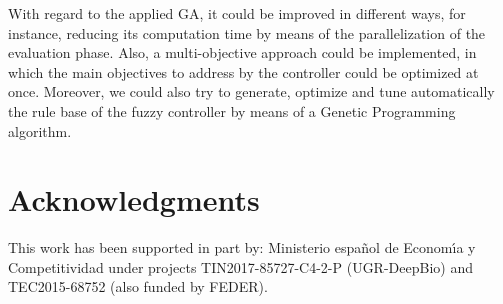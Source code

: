 \documentclass[conference]{IEEEtran}
\begin{document}
With regard to the applied GA, it could be improved in different ways,
for instance, reducing its computation time by means of the
parallelization of the evaluation phase. Also, a multi-objective
approach could be implemented, in which the main objectives to address
by the controller could be optimized at once. 
Moreover, we could also try to generate, optimize and tune
automatically the rule base of the fuzzy controller by means of a
Genetic Programming algorithm.  

\section*{Acknowledgments}

This work has been supported in part by: Ministerio espa\~{n}ol de
Econom\'{\i}a y Competitividad under projects  TIN2017-85727-C4-2-P (UGR-DeepBio) and TEC2015-68752 (also funded by FEDER).



\end{document}
